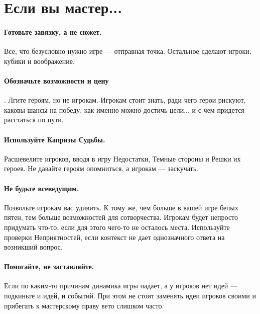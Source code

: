 \section*{Если вы мастер...}

\paragraph{Готовьте завязку, а не сюжет.} Все, что безусловно нужно игре — отправная точка. Остальное сделают игроки, кубики и воображение.
\paragraph{Обозначьте возможности и цену}. Лгите героям, но не игрокам. Игрокам стоит знать, ради чего герои рискуют, каковы шансы на победу, как именно можно достичь цели... и с чем придется расстаться по пути.
\paragraph{Используйте Капризы Судьбы.} Расшевелите игроков, вводя в игру Недостатки, Темные стороны и Решки их героев. Не давайте героям опомниться, а игрокам — заскучать.
\paragraph{Не будьте всеведущим.} Позвольте игрокам вас удивить. К тому же, чем больше в вашей игре белых пятен, тем больше возможностей для сотворчества. Игрокам будет непросто придумать что-то, если для этого чего-то не осталось места. Используйте проверки Неприятностей, если контекст не дает однозначного ответа на возникший вопрос.
\paragraph{Помогайте, не заставляйте.} Если по каким-то причинам динамика игры падает, а у игроков нет идей — подкиньте и идей, и событий. При этом не стоит заменять идеи игроков своими и прибегать к мастерскому праву вето слишком часто.